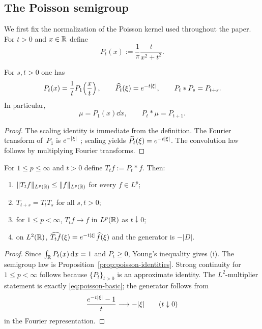 \subsection{The Poisson semigroup}

We first fix the normalization of the Poisson kernel used throughout the
paper.  For $t>0$ and $x\in\mathbb{R}$ define
\begin{equation}\label{eq:poisson-kernel}
P_t(x):=\frac{1}{\pi}\frac{t}{x^{2}+t^{2}}.
\end{equation}

\begin{proposition}%
\label{prop:poisson-identities}
For $s,t>0$ one has
\begin{equation}\label{eq:poisson-basic}
P_t(x)=\frac{1}{t}P_1\!\left(\frac{x}{t}\right),
\qquad
\widehat{P_t}(\xi)=e^{-t\lvert \xi\rvert},
\qquad
P_t*P_s=P_{t+s}.
\end{equation}
In particular,
\[
\mu=P_1(x)\dd x,
\qquad
P_t*\mu=P_{t+1}.
\]
\end{proposition}

\begin{proof}
The scaling identity is immediate from the definition.  The Fourier
transform of~$P_1$ is $e^{-\lvert \xi\rvert}$
\cite[Chapter~III]{Stein1971}; scaling yields
$\widehat{P_t}(\xi)=e^{-t\lvert \xi\rvert}$.  The convolution law follows by
multiplying Fourier transforms.
\end{proof}

\begin{proposition}%
\label{thm:poisson-semigroup-law}
For $1\le p\le\infty$ and $t>0$ define
$T_t f:=P_t*f$.  Then:
\begin{enumerate}[label=(\roman*)]
\item $\|T_t f\|_{L^p(\mathbb{R})}\le \|f\|_{L^p(\mathbb{R})}$ for every $f\in L^p$;
\item $T_{t+s}=T_tT_s$ for all $s,t>0$;
\item for $1\le p<\infty$, $T_t f\to f$ in $L^p(\mathbb{R})$ as $t\downarrow 0$;
\item on $L^2(\mathbb{R})$, $\widehat{T_t f}(\xi)=e^{-t\lvert \xi\rvert}\widehat f(\xi)$
      and the generator is $-|D|$.
\end{enumerate}
\end{proposition}

\begin{proof}
Since $\int_{\mathbb{R}}P_t(x)\,\mathrm{d} x=1$ and $P_t\ge 0$, Young's inequality gives
(i).  The semigroup law is Proposition~\ref{prop:poisson-identities}.
Strong continuity for $1\le p<\infty$ follows because $\{P_t\}_{t>0}$ is
an approximate identity.  The $L^2$-multiplier statement is exactly
\eqref{eq:poisson-basic}; the generator follows from
\[
\frac{e^{-t\lvert \xi\rvert}-1}{t}\longrightarrow -\lvert \xi\rvert
\qquad(t\downarrow 0)
\]
in the Fourier representation.
\end{proof}

